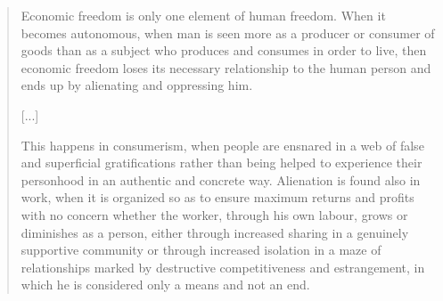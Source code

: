 \documentclass[letterpaper]{article}
\begin{document}
\begin{quote}
  Economic freedom is only one element of human freedom. When it becomes autonomous, when man is seen more as a producer or consumer of goods than as a subject who produces and consumes in order to live, then economic freedom loses its necessary relationship to the human person and ends up by alienating and oppressing him.

  [...]


  This happens in consumerism, when people are ensnared in a web of false and superficial gratifications rather than being helped to experience their personhood in an authentic and concrete way. Alienation is found also in work, when it is organized so as to ensure maximum returns and profits with no concern whether the worker, through his own labour, grows or diminishes as a person, either through increased sharing in a genuinely supportive community or through increased isolation in a maze of relationships marked by destructive competitiveness and estrangement, in which he is considered only a means and not an end.


\end{quote}
\end{document}
